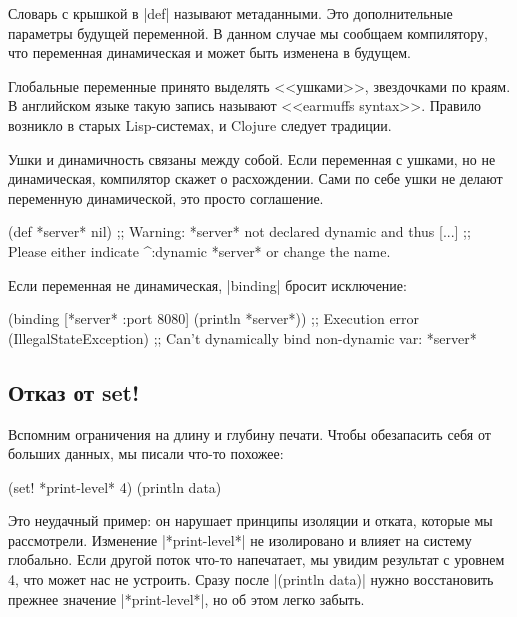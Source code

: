 Словарь с крышкой в \spverb|def| называют метаданными. Это дополнительные
параметры будущей переменной. В данном случае мы сообщаем компилятору, что
переменная динамическая и может быть изменена в будущем.

Глобальные переменные принято выделять <<ушками>>, звездочками по краям. В
английском языке такую запись называют <<earmuffs syntax>>. Правило возникло в
старых Lisp-системах, и Clojure следует традиции.

Ушки и динамичность связаны между собой. Если переменная с ушками, но не
динамическая, компилятор скажет о расхождении. Сами по себе ушки не делают
переменную динамической, это просто соглашение.

\begin{english}
  \begin{clojure}
(def *server* nil)
;; Warning: *server* not declared dynamic and thus [...]
;; Please either indicate ^:dynamic *server* or change the name.
  \end{clojure}
\end{english}

Если переменная не динамическая, \spverb|binding| бросит исключение:

\begin{english}
  \begin{clojure}
(binding [*server* {:port 8080}]
  (println *server*))
;; Execution error (IllegalStateException)
;; Can't dynamically bind non-dynamic var: *server*
  \end{clojure}
\end{english}

\subsection{Отказ от set!}

Вспомним ограничения на длину и глубину печати. Чтобы обезапасить себя от
больших данных, мы писали что-то похожее:

\begin{english}
  \begin{clojure}
(set! *print-level* 4)
(println data)
  \end{clojure}
\end{english}

Это неудачный пример: он нарушает принципы изоляции и отката, которые мы
рассмотрели. Изменение \spverb|*print-level*| не изолировано и влияет на систему
глобально. Если другой поток что-то напечатает, мы увидим результат с уровнем 4,
что может нас не устроить. Сразу после \spverb|(println data)| нужно
восстановить прежнее значение \spverb|*print-level*|, но об этом легко забыть.

